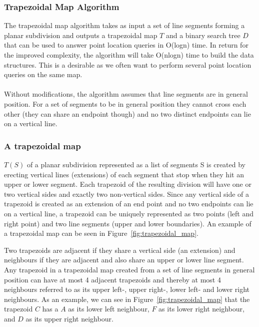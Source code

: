 \subsubsection{Trapezoidal Map Algorithm}
The trapezoidal map algorithm takes as input a set of line segments forming a planar subdivision and outputs a trapezoidal map $T$ and a binary search tree $D$ that can be used to answer point location queries in O(logn) time. In return for the improved complexity, the algorithm will take O(nlogn) time to build the data structures. This is a desirable as we often want to perform several point location queries on the same map. 

\paragraph{}
Without modifications, the algorithm assumes that line segments are in general position. For a set of segments to be in general position they cannot cross each other (they can share an endpoint though) and no two distinct endpoints can lie on a vertical line.

\subsubsection{A trapezoidal map}
$T(S)$ of a planar subdivision represented as a list of segments S is created by erecting vertical lines (extensions) of each segment that stop when they hit an upper or lower segment. Each trapezoid of the resulting division will have one or two vertical sides and exactly two non-vertical sides. Since any vertical side of a trapezoid is created as an extension of an end point and no two endpoints can lie on a vertical line, a trapezoid can be uniquely represented as two points (left and right point) and two line segments (upper and lower boundaries). An example of a trapezoidal map can be seen in Figure~\ref{fig:trapezoidal_map}.

Two trapezoids are adjacent if they share a vertical side (an extension) and neighbours if they are adjacent and also share an upper or lower line segment. Any trapezoid in a trapezoidal map created from a set of line segments in general position can have at most 4 adjacent trapezoids and thereby at most 4 neighbours referred to as its upper left-, upper right-, lower left- and lower right neighbours. As an example, we can see in Figure~\ref{fig:trapezoidal_map} that the trapezoid $C$ has a $A$ as its lower left neighbour, $F$ as its lower right neighbour, and $D$ as its upper right neighbour.
